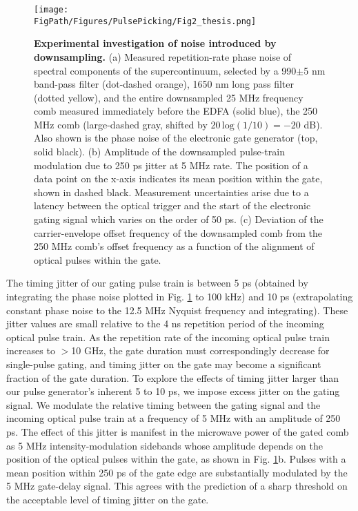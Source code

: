 \begin{figure}[htpb]
	\begin{center}
		\texttt{[image: \\FigPath/Figures/PulsePicking/Fig2\_thesis.png]}
	\end{center}
	\caption[Experimental investigation of noise introduced by downsampling]{\textbf{Experimental investigation of noise introduced by downsampling.} (a) Measured repetition-rate phase noise of spectral components of the supercontinuum, selected by a 990$\pm$5 nm band-pass filter (dot-dashed orange), 1650 nm long pass filter (dotted yellow), and the entire downsampled 25 MHz frequency comb measured immediately before the EDFA (solid blue), the 250 MHz comb (large-dashed gray, shifted by $20\,\mathrm{log}(1/10)=-20$ dB). Also shown is the phase noise of the electronic gate generator (top, solid black). (b) Amplitude of the downsampled pulse-train modulation due to 250 ps jitter at 5 MHz rate. The position of a data point on the x-axis indicates its mean position within the gate, shown in dashed black. Measurement uncertainties arise due to a latency between the optical trigger and the start of the electronic gating signal which varies on the order of 50 ps. (c) Deviation of the carrier-envelope offset frequency of the downsampled comb from the 250 MHz comb's offset frequency as a function of the alignment of optical pulses within the gate.}
	\label{fig:PPNoiseExp}
\end{figure} 

The timing jitter of our gating pulse train is between 5 ps (obtained by integrating the phase noise plotted in Fig. \ref{fig:PPNoiseExp} to 100 kHz) and 10 ps (extrapolating constant phase noise to the 12.5 MHz Nyquist frequency and integrating). These jitter values are small relative to the 4 ns repetition period of the incoming optical pulse train. As the repetition rate of the incoming optical pulse train increases to $>$10 GHz, the gate duration must correspondingly decrease for single-pulse gating, and timing jitter on the gate may become a significant fraction of the gate duration. To explore the effects of timing jitter larger than our pulse generator's inherent 5 to 10 ps, we impose excess jitter on the gating signal. We modulate the relative timing between the gating signal and the incoming optical pulse train at a frequency of 5 MHz with an amplitude of 250 ps. The effect of this jitter is manifest in the microwave power of the gated comb as 5 MHz intensity-modulation sidebands whose amplitude depends on the position of the optical pulses within the gate, as shown in Fig. \ref{fig:PPNoiseExp}b.  Pulses with a mean position within 250 ps of the gate edge are substantially modulated by the 5 MHz gate-delay signal. This agrees with the prediction of a sharp threshold on the acceptable level of timing jitter on the gate.


